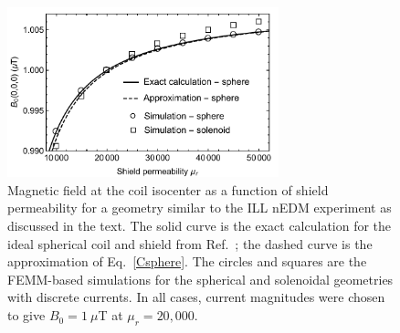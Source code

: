 
\begin{figure}[h!]
\begin{center}
   \includegraphics[width=0.7\textwidth]{femm_and_calcs.pdf}
    \caption{Magnetic field at the coil isocenter as a function of shield
      permeability  for a geometry similar to the ILL nEDM
      experiment as discussed in the text.  The solid curve is the exact calculation for the ideal spherical coil and shield from Ref.~\cite{bib:bidinostimartin}; the dashed curve is the approximation of Eq.~\ref{Csphere}. The  circles and squares are the
      FEMM-based simulations for the spherical and solenoidal geometries
      with discrete currents.  In all cases, current magnitudes  were chosen to give $B_0=1~\mu$T at 
      $\mu_r=20,000$.}
    \label{fig:Magnetic_Field}
    \end{center}
\end{figure} 




